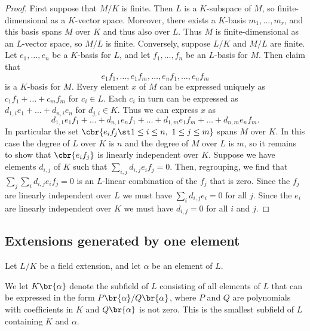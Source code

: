 \begin{proof}
First suppose that $ M / K $ is finite. Then $ L $ is a $ K $-subspace of $ M $, so finite-dimensional as a $ K $-vector space. Moreover, there exists a $ K $-basis $ m_1, \dots, m_r $, and this basis spans $ M $ over $ K $ and thus also over $ L $. Thus $ M $ is finite-dimensional as an $ L $-vector space, so $ M / L $ is finite. Conversely, suppose $ L / K $ and $ M / L $ are finite. Let $ e_1, \dots, e_n $ be a $ K $-basis for $ L $, and let $ f_1, \dots, f_n $ be an $ L $-basis for $ M $. Then claim that
$$ e_1f_1, \dots, e_1f_m, \dots, e_nf_1, \dots, e_nf_m $$
is a $ K $-basis for $ M $. Every element $ x $ of $ M $ can be expressed uniquely as $ c_1f_1 + \dots + c_mf_m $ for $ c_i \in L $. Each $ c_i $ in turn can be expressed as $ d_{1, i}e_1 + \dots + d_{n, i}e_n $ for $ d_{j, i} \in K $. Thus we can express $ x $ as
$$ d_{1, 1}e_1f_1 + \dots + d_{n, 1}e_nf_1 + \dots + d_{1, m}e_1f_m + \dots + d_{n, m}e_nf_m. $$
In particular the set $ \cbr{e_if_j \st 1 \le i \le n, \ 1 \le j \le m} $ spans $ M $ over $ K $. In this case the degree of $ L $ over $ K $ is $ n $ and the degree of $ M $ over $ L $ is $ m $, so it remains to show that $ \cbr{e_if_j} $ is linearly independent over $ K $. Suppose we have elements $ d_{i, j} $ of $ K $ such that $ \sum_{i, j} d_{i, j}e_if_j = 0 $. Then, regrouping, we find that $ \sum_j \sum_i d_{i, j}e_if_j = 0 $ is an $ L $-linear combination of the $ f_j $ that is zero. Since the $ f_j $ are linearly independent over $ L $ we must have $ \sum_i d_{i, j}e_i = 0 $ for all $ j $. Since the $ e_i $ are linearly independent over $ K $ we must have $ d_{i, j} = 0 $ for all $ i $ and $ j $.
\end{proof}

\pagebreak

\subsection{Extensions generated by one element}


Let $ L / K $ be a field extension, and let $ \alpha $ be an element of $ L $.

\begin{definition}
We let $ K\br{\alpha} $ denote the subfield of $ L $ consisting of all elements of $ L $ that can be expressed in the form $ P\br{\alpha} / Q\br{\alpha} $, where $ P $ and $ Q $ are polynomials with coefficients in $ K $ and $ Q\br{\alpha} $ is not zero. This is the smallest subfield of $ L $ containing $ K $ and $ \alpha $.
\end{definition}

